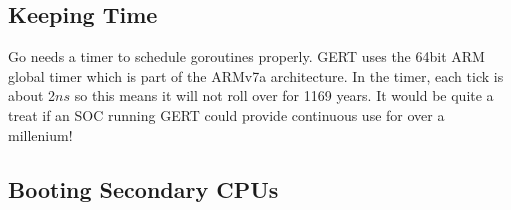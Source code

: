 \subsection{Keeping Time}

Go needs a timer to schedule goroutines properly. GERT uses the 64bit ARM global timer which
is part of the ARMv7a architecture. In the timer, each tick is about 2$ns$ so this means it will
not roll over for 1169 years. It would be quite a treat if an SOC running GERT could provide
continuous use for over a millenium!

\subsection{Booting Secondary CPUs}




